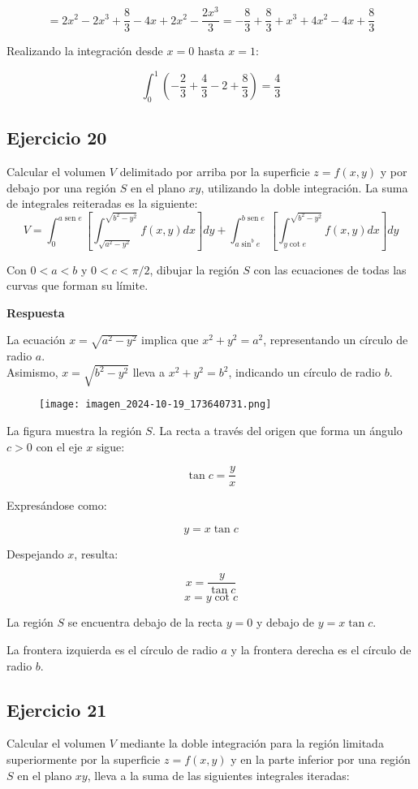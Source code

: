 \documentclass{report}
\begin{document}
\[
= 2x^2 - 2x^3 + \frac{8}{3} - 4x + 2x^2 - \frac{2x^3}{3} = -\frac{8}{3} + \frac{8}{3} + x^3 + 4x^2 - 4x + \frac{8}{3}
\]

Realizando la integración desde \( x = 0 \) hasta \( x = 1 \):

\[
\int_0^1 \left( - \frac{2}{3} + \frac{4}{3} - 2 + \frac{8}{3} \right) = \frac{4}{3}
\]\subsection{Ejercicio 20}
Calcular el volumen $V$ delimitado por arriba por la superficie $z=f(x, y)$ y por debajo por una región $S$ en el plano $xy$, utilizando la doble integración. La suma de integrales reiteradas es la siguiente:
$$
V=\int_{0}^{a \operatorname{sen} e}\left[\int_{\sqrt{a^{2}-y^{2}}}^{\sqrt{b^{2}-y^{2}}} f(x, y) d x\right] d y+\int_{a \sin ^{b} e}^{b \operatorname{sen} e}\left[\int_{y \cot e}^{\sqrt{b^{2}-y^{2}}} f(x, y) d x\right] d y
$$

Con $0<a<b$ y $0<c<\pi / 2$, dibujar la región $S$ con las ecuaciones de todas las curvas que forman su límite.

\textbf{Respuesta}

La ecuación $x=\sqrt{a^2-y^2}$ implica que $x^2+y^2=a^2$, representando un círculo de radio $a$.\\

Asimismo, $x=\sqrt{b^2-y^2}$ lleva a $x^2+y^2=b^2$, indicando un círculo de radio $b$.

\begin{figure}[h]
\texttt{[image: imagen\_2024-10-19\_173640731.png]}
\centering
\end{figure}

La figura muestra la región $S$. La recta a través del origen que forma un ángulo $c > 0$ con el eje $x$ sigue:

\[
\tan c = \frac{y}{x}
\]

Expresándose como:

\[
y = x \tan c
\]

Despejando $x$, resulta:

\[
x = \frac{y}{\tan c}
\]
\[
x = y \cot c
\]

La región $S$ se encuentra debajo de la recta $y = 0$ y debajo de $y = x \tan c$. 

La frontera izquierda es el círculo de radio $a$ y la frontera derecha es el círculo de radio $b$.\subsection{Ejercicio 21}
Calcular el volumen $V$ mediante la doble integración para la región limitada superiormente por la superficie $z=f(x, y)$ y en la parte inferior por una región $S$ en el plano $xy$, lleva a la suma de las siguientes integrales iteradas:
\end{document}
